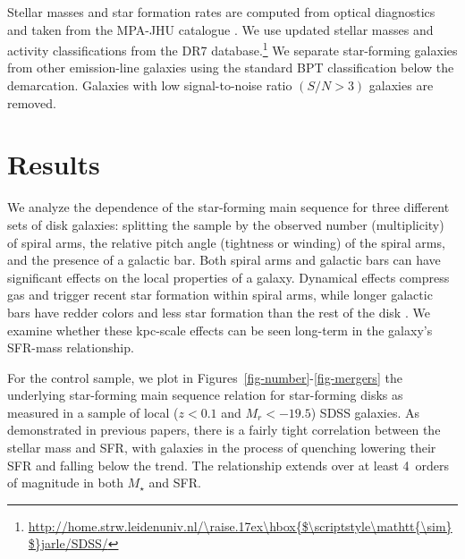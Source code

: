 \documentclass{emulateapj}
\newcommand{\mytilde}{\raise.17ex\hbox{$\scriptstyle\mathtt{\sim}$}}
\begin{document}
Stellar masses and star formation rates are computed from optical diagnostics and taken from the MPA-JHU catalogue \citep{kau03a,bri04}. We use updated stellar masses and activity classifications from the DR7 database.\footnote{\url{http://home.strw.leidenuniv.nl/\mytilde jarle/SDSS/}} We separate star-forming galaxies from other emission-line galaxies using the standard BPT classification \citep{bal81} below the \citet{kau03} demarcation. Galaxies with low signal-to-noise ratio $(S/N > 3)$ galaxies are removed. 



\section{Results} \label{sec-results}

We analyze the dependence of the star-forming main sequence for three different sets of disk galaxies: splitting the sample by the observed number (multiplicity) of spiral arms, the relative pitch angle (tightness or winding) of the spiral arms, and the presence of a galactic bar. Both spiral arms and galactic bars can have significant effects on the local properties of a galaxy. Dynamical effects compress gas and trigger recent star formation within spiral arms, while longer galactic bars have redder colors and less star formation than the rest of the disk \citep{hoy11}. We examine whether these kpc-scale effects can be seen long-term in the galaxy's SFR-mass relationship. 

For the control sample, we plot in Figures~\ref{fig-number}-\ref{fig-mergers} the underlying star-forming main sequence relation for star-forming disks as measured in a sample of local ($z<0.1$ and $M_r<-19.5$) SDSS galaxies. As demonstrated in previous papers, there is a fairly tight correlation between the stellar mass and SFR, with galaxies in the process of quenching lowering their SFR and falling below the trend. The relationship extends over at least 4~orders of magnitude in both $M_\star$ and SFR. 
\end{document}
